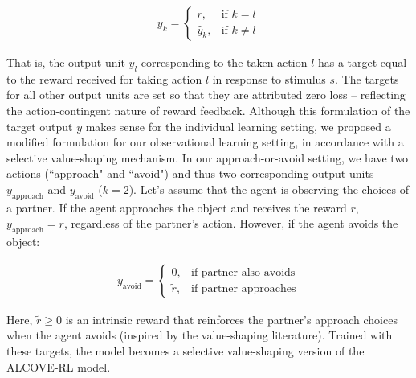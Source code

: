 \documentclass[11pt]{article} %
\begin{document}
\begin{align}
    y_k = 
    \begin{cases}
    r, & \text{if } k = l \\
    \hat{y}_k, & \text{if } k \neq l
    \end{cases}
\end{align}

That is, the output unit $y_l$ corresponding to the taken action $l$ has a target equal to the reward received for taking action $l$ in response to stimulus $s$. The targets for all other output units are set so that they are attributed zero loss -- reflecting the action-contingent nature of reward feedback. Although this formulation of the target output $y$ makes sense for the individual learning setting, we proposed a modified formulation for our observational learning setting, in accordance with a selective value-shaping mechanism. In our approach-or-avoid setting, we have two actions (``approach" and ``avoid") and thus two corresponding output units $y_{\text{approach}}$ and $y_{\text{avoid}}$ ($k=2$). Let's assume that the agent is observing the choices of a partner. If the agent approaches the object and receives the reward $r$, $ y_{\text{approach}} = r $, regardless of the partner's action. However, if the agent avoids the object:

\begin{align}
    y_{\text{avoid}} = 
    \begin{cases}
        0, & \text{if partner also avoids} \\
        \tilde{r}, & \text{if partner approaches} 
    \end{cases}
\end{align}

Here, $\tilde{r} \geq 0$ is an intrinsic reward that reinforces the partner's approach choices when the agent avoids (inspired by the value-shaping literature). Trained with these targets, the model becomes a selective value-shaping version of the ALCOVE-RL model.
\end{document}
